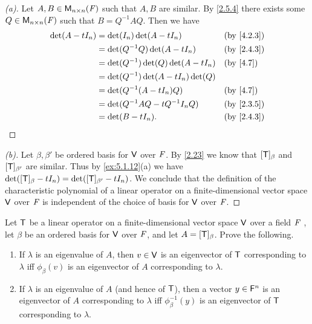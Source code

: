 \begin{proof}[(a)]
	Let \(A, B \in \ms[n][n][\F]\) such that \(A, B\) are similar.
	By \cref{2.5.4} there exists some \(Q \in \ms[n][n][\F]\) such that \(B = Q^{-1} A Q\).
	Then we have
	\begin{align*}
		\det(A - t I_n) & = \det(I_n) \det(A - t I_n)            &  & \by{4.2.3} \\
		                & = \det(Q^{-1} Q) \det(A - t I_n)       &  & \by{2.4.3} \\
		                & = \det(Q^{-1}) \det(Q) \det(A - t I_n) &  & \by{4.7}   \\
		                & = \det(Q^{-1}) \det(A - t I_n) \det(Q)                 \\
		                & = \det(Q^{-1} (A - t I_n) Q)           &  & \by{4.7}   \\
		                & = \det(Q^{-1} A Q - t Q^{-1} I_n Q)    &  & \by{2.3.5} \\
		                & = \det(B - t I_n).                     &  & \by{2.4.3}
	\end{align*}
\end{proof}

\begin{proof}[(b)]
	Let \(\beta, \beta'\) be ordered basis for \(\mathsf{V}\) over \(\mathit{F}\).
	By \cref{2.23} we know that \([\mathsf{T}]_{\beta}\) and \([\mathsf{T}]_{\beta'}\) are similar.
	Thus by \cref{ex:5.1.12}(a) we have \(\det([\mathsf{T}]_{\beta} - t I_n) = \det([\mathsf{T}]_{\beta'} - t I_n)\).
	We conclude that the definition of the characteristic polynomial of a linear operator on a finite-dimensional vector space \(\mathsf{V}\) over \(\mathit{F}\) is independent of the choice of basis for \(\mathsf{V}\) over \(\mathit{F}\).
\end{proof}

\begin{ex}\label{ex:5.1.13}
	Let \(\mathsf{T}\) be a linear operator on a finite-dimensional vector space \(\mathsf{V}\) over a field \(\mathit{F}\) , let \(\beta\) be an ordered basis for \(\mathsf{V}\) over \(\mathit{F}\), and let \(A = [\mathsf{T}]_{\beta}\).
	Prove the following.
	\begin{enumerate}
		\item If \(\lambda\) is an eigenvalue of \(A\), then \(v \in \mathsf{V}\) is an eigenvector of \(\mathsf{T}\) corresponding to \(\lambda\) iff \(\phi_{\beta}(v)\) is an eigenvector of \(A\) corresponding to \(\lambda\).
		\item If \(\lambda\) is an eigenvalue of \(A\) (and hence of \(\mathsf{T}\)), then a vector \(y \in \mathsf{F}^n\) is an eigenvector of \(A\) corresponding to \(\lambda\) iff \(\phi_{\beta}^{-1}(y)\) is an eigenvector of \(\mathsf{T}\) corresponding to \(\lambda\).
	\end{enumerate}
\end{ex}

